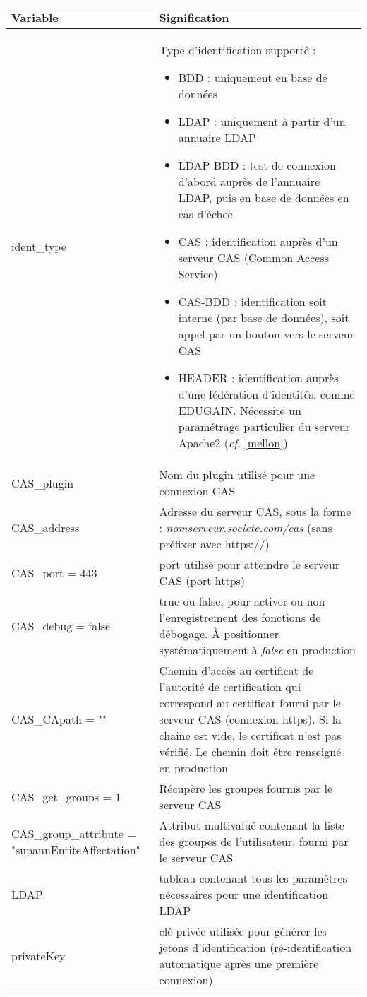 \begin{longtable}{|p{6cm}|p{10cm}|}
\hline
\textbf{Variable} & \textbf{Signification} \\
\hline
\endhead
ident\_type & Type d'identification supporté :
\begin{itemize}
	\item BDD : uniquement en base de données
	\item LDAP : uniquement à partir d'un annuaire LDAP
	\item LDAP-BDD : test de connexion d'abord auprès de l'annuaire LDAP, puis en base de données en cas d'échec
	\item CAS : identification auprès d'un serveur CAS (Common Access Service)
	\item CAS-BDD : identification soit interne (par base de données), soit appel par un bouton vers le serveur CAS
	\item HEADER : identification auprès d'une fédération d'identités, comme EDUGAIN. Nécessite un paramétrage particulier du serveur Apache2 (\textit{cf.} \ref{mellon})
\end{itemize}
\\
\hline
CAS\_plugin & Nom du plugin utilisé pour une connexion CAS \\
\hline
CAS\_address & Adresse du serveur CAS, sous la forme : \textit{nomserveur.societe.com/cas} (sans préfixer avec https://)\\
\hline
CAS\_port = 443 & port utilisé pour atteindre le serveur CAS (port https)\\
\hline
CAS\_debug = false & true ou false, pour activer ou non l'enregistrement des fonctions de débogage. À positionner systématiquement à \textit{false} en production \\
\hline
CAS\_CApath = "" & Chemin d'accès au certificat de l'autorité de certification qui correspond au certificat fourni par le serveur CAS (connexion https). Si la chaîne est vide, le certificat n'est pas vérifié. Le chemin doit être renseigné en production \\
\hline
CAS\_get\_groups = 1 & Récupère les groupes fournis par le serveur CAS \\
\hline
CAS\_group\_attribute = "supannEntiteAffectation" & Attribut multivalué contenant la liste des groupes de l'utilisateur, fourni par le serveur CAS \\
\hline
LDAP & tableau contenant tous les paramètres nécessaires pour une identification LDAP \\
\hline
privateKey & clé privée utilisée pour générer les jetons d'identification (ré-identification automatique après une première connexion) \\

\end{longtable}
